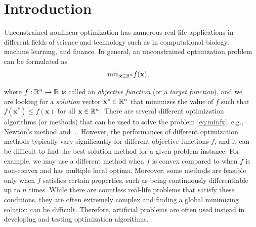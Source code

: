 \documentclass[a4paper,english,titlepage,12pt]{article}
\newcommand{\vect}[1]{\ensuremath{\mathbf{#1}}}
\newcommand{\R}{\ensuremath\mathbb{R}}
\begin{document}
\section{Introduction}

Unconstrained nonlinear optimization has numerous real-life applications in different fields of science and technology such as in computational biology, machine learning, and finance.
In general, an unconstrained optimization problem can be formulated as
\begin{equation}\label{eq:minfx}
    \mathrm{min}_{\vect{x} \in \R^n} f(\vect{x}),
\end{equation}

where $f : \R^n \rightarrow \R$ is called an \emph{objective function} (or a \emph{target function}), and we are looking for a \emph{solution} vector $\vect{x}^* \in \R^n$ that minimizes the value of $f$ such that $f(\vect{x}^*) \leq f(\vect{x})$ for all $\vect{x}\in \R^n$. There are several different optimization algorithms (or methods) that can be used to solve the problem \eqref{eq:minfx}, e.g., Newton's method and ... However, the performances of different optimization methods typically vary significantly for different objective functions $f$, and it can be difficult to find the best solution method for a given problem instance. For example, we may use a different method when $f$ is convex compared to when $f$ is non-convex and has multiple local optima. Moreover, some methods are feasible only when $f$ satisfies certain properties, such as being continuously differentiable up to $n$ times.
While there are countless real-life problems that satisfy these conditions, they are often extremely complex and finding a global minimizing solution can be difficult. 
Therefore, artificial problems are often used instead in developing and testing optimization algorithms. \cite{test_function_collection_artifical}
\end{document}
